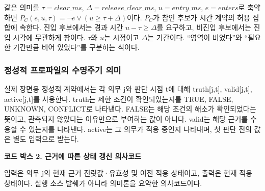 \documentclass[10pt,a4paper,twocolumn]{article}\usepackage[margin=18mm]{geometry}\usepackage{fontspec,kotex}
\begin{document}
같은 의미를 $\tau=\mathit{clear\_ms}$, $\Delta=\mathit{release\_clear\_ms}$, $u=\mathit{entry\_ms}$, $e=\mathit{enters}$로 축약하면 $P_C(e,u,\tau)=\neg e\lor(u\geq\tau+\Delta)$이다. $P_C$가 참인 후보가 시간 계약의 허용 집합에 속한다. 진입 후보에서는 경과 시간 $u-\tau\geq\Delta$를 요구하고, 비진입 후보에서는 진입 시각에 무관하게 참이다. $\tau$와 $u$는 시점이고 $\Delta$는 기간이다. “영역이 비었다”와 “필요한 기간만큼 비어 있었다”를 구분하는 식이다.\par

\subsubsection{정성적 프로파일의 수명주기 의미}

실제 장면용 정성적 계약에서는 각 의무 j와 판단 시점 t에 대해 {\ttfamily{}\selectfont\footnotesize truth[j,t]}, {\ttfamily{}\selectfont\footnotesize valid[j,t]}, {\ttfamily{}\selectfont\footnotesize active[j,t]}를 사용한다. {\ttfamily{}\selectfont\footnotesize truth}는 제한 조건이 확인되었는지를 TRUE, FALSE, UNKNOWN, CONFLICT로 나타낸다. FALSE는 해당 조건의 해소가 확인되었다는 뜻이고, 관측되지 않았다는 이유만으로 부여하는 값이 아니다. {\ttfamily{}\selectfont\footnotesize valid}는 해당 근거를 수용할 수 있는지를 나타낸다. {\ttfamily{}\selectfont\footnotesize active}는 그 의무가 적용 중인지 나타내며, 첫 판단 전의 값은 별도 입력으로 받는다.\par

\textbf{코드 박스 2. 근거에 따른 상태 갱신 의사코드}\par

입력은 의무 j의 현재 근거 진릿값·유효성 및 이전 적용 상태이고, 출력은 현재 적용 상태이다. 실행 소스 발췌가 아니라 의미론을 요약한 의사코드이다.\par
\end{document}
